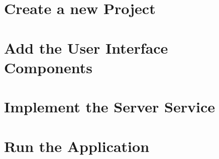\documentclass{article}
\begin{document}
\section{Create a new Project}

\section{Add the User Interface Components}

\section{Implement the Server Service}

\section{Run the Application}

\end{document}
